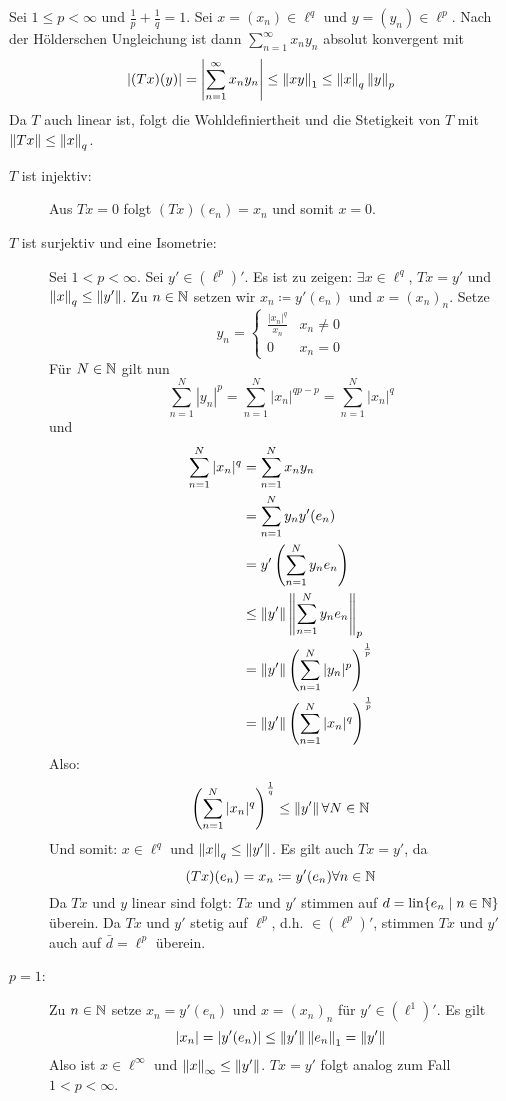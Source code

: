 \begin{beweis}
	Sei $ 1\leq p<\infty $ und $ \frac{1}{p}+\frac{1}{q}=1 $. Sei $ x=(x_n)\in\ell^q $ und $ y=(y_n)\in\ell^p $. Nach der H\"olderschen Ungleichung ist dann $ \sum_{n=1}^{\infty}x_ny_n $ absolut konvergent mit
	\[ |(Tx)(y)|=\left|\sum_{n=1}^{\infty}x_ny_n\right|\leq\left\|xy\right\|_1\leq\left\|x\right\|_q\left\|y\right\|_p \]
	Da $ T $ auch linear ist, folgt die Wohldefiniertheit und die Stetigkeit von $ T $ mit $ \left\|Tx\right\|\leq\left\|x\right\|_q $.
	\begin{description}
		\item[$ T $ ist injektiv:] Aus $ Tx=0 $ folgt $ (Tx)(e_n)=x_n $ und somit $ x=0 $.
		\item[$ T $ ist surjektiv und eine Isometrie:] Sei $ 1<p<\infty $. Sei $ y'\in(\ell^p)' $. Es ist zu zeigen: $ \exists x\in\ell^q $, $ Tx=y' $ und $ \left\|x\right\|_q\leq\left\|y'\right\| $. Zu $ n\in\mathbb{N} $ setzen wir $ x_n\coloneqq y'(e_n) $ und $ x=(x_n)_n $. Setze
		\[ y_n= \begin{cases}
		\frac{|x_n|^q}{x_n}&x_n\neq 0\\ 0&x_n=0
		\end{cases} \]
		F\"ur $ N\in\mathbb{N} $ gilt nun
		\[ \sum_{n=1}^{N}|y_n|^p=\sum_{n=1}^{N}|x_n|^{qp-p}=\sum_{n=1}^{N}|x_n|^q \]
		und 
		\begin{align*} \sum_{n=1}^{N}|x_n|^q&=\sum_{n=1}^{N}x_ny_n\\&=\sum_{n=1}^{N}y_ny'(e_n)\\&=y'\left(\sum_{n=1}^{N}y_ne_n\right)\\&\leq\left\|y'\right\|\left\|\sum_{n=1}^{N}y_ne_n\right\|_p\\&=\left\|y'\right\|\left(\sum_{n=1}^{N}|y_n|^p\right)^\frac{1}{p}\\&=\left\|y'\right\|\left(\sum_{n=1}^{N}|x_n|^q\right)^\frac{1}{p} \end{align*}
		Also:
		\[ \left(\sum_{n=1}^{N}|x_n|^q\right)^\frac{1}{q}\leq\left\|y'\right\|\forall N\in\mathbb{N} \]
		Und somit: $ x\in\ell^q $ und $ \left\|x\right\|_q\leq\left\|y'\right\| $. Es gilt auch $ Tx=y' $, da
		\[ (Tx)(e_n)=x_n\coloneqq y'(e_n)\forall n\in\mathbb{N} \]
		Da $ Tx $ und $ y $ linear sind folgt: $ Tx $ und $ y' $ stimmen auf $ d=\text{lin}\lbrace e_n\mid n\in\mathbb{N}\rbrace $ \"uberein. Da $ Tx $ und $ y' $ stetig auf $ \ell^p $, d.h. $ \in(\ell^p)' $, stimmen $ Tx $ und $ y' $ auch auf $ \bar d=\ell^p $ \"uberein.
		\item[$ p=1 $:] Zu $ n\in\mathbb{N} $ setze $ x_n=y'(e_n) $ und $ x=(x_n)_n $ f\"ur $ y'\in(\ell^1)' $. Es gilt
		\[ |x_n|=|y'(e_n)|\leq\left\|y'\right\|\left\|e_n\right\|_1=\left\|y'\right\| \]
		Also ist $ x\in\ell^\infty $ und $ \left\|x\right\|_\infty\leq\left\|y'\right\| $. $ Tx=y' $ folgt analog zum Fall $ 1<p<\infty $.

\end{description}
\end{beweis}
